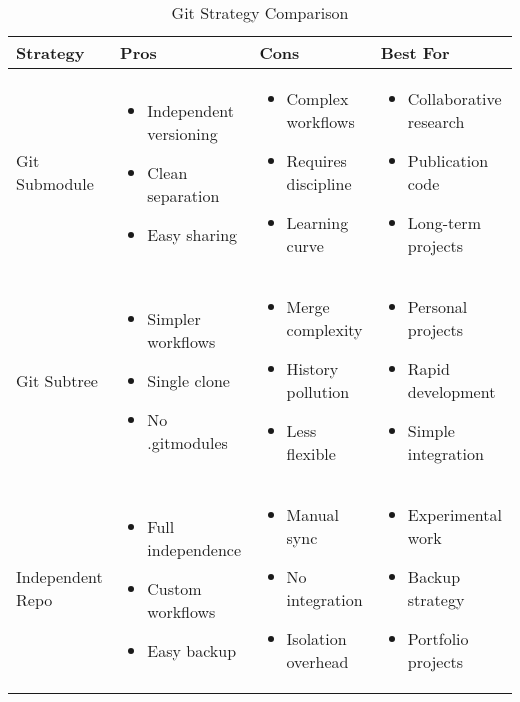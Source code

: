 \documentclass[11pt,a4paper]{article}
\begin{document}
\begin{table}[h]
\centering
\begin{tabular}{|l|p{3cm}|p{3cm}|p{3cm}|}
\hline
\textbf{Strategy} & \textbf{Pros} & \textbf{Cons} & \textbf{Best For} \\
\hline
Git Submodule & 
\begin{itemize}
\item Independent versioning
\item Clean separation
\item Easy sharing
\end{itemize} & 
\begin{itemize}
\item Complex workflows
\item Requires discipline
\item Learning curve
\end{itemize} & 
\begin{itemize}
\item Collaborative research
\item Publication code
\item Long-term projects
\end{itemize} \\
\hline
Git Subtree & 
\begin{itemize}
\item Simpler workflows
\item Single clone
\item No .gitmodules
\end{itemize} & 
\begin{itemize}
\item Merge complexity
\item History pollution
\item Less flexible
\end{itemize} & 
\begin{itemize}
\item Personal projects
\item Rapid development
\item Simple integration
\end{itemize} \\
\hline
Independent Repo & 
\begin{itemize}
\item Full independence
\item Custom workflows
\item Easy backup
\end{itemize} & 
\begin{itemize}
\item Manual sync
\item No integration
\item Isolation overhead
\end{itemize} & 
\begin{itemize}
\item Experimental work
\item Backup strategy
\item Portfolio projects
\end{itemize} \\
\hline
\end{tabular}
\caption{Git Strategy Comparison}
\end{table}
\end{document}
